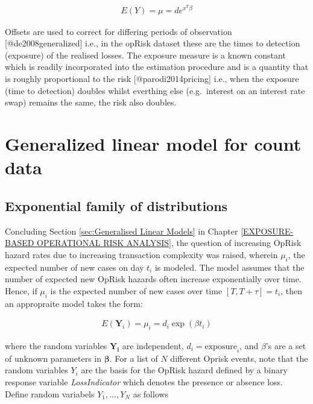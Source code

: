 \documentclass[]{article}
\begin{document}
\singlespacing

\begin{eqnarray}
E(Y) = \mu = d e^{x^T\beta}
\end{eqnarray} \doublespacing

Offsets are used to correct for differing periods of observation
{[}@de2008generalized{]} i.e., in the opRisk dataset these are the times
to detection (exposure) of the realised losses. The exposure measure is
a known constant which is readily incorporated into the estimation
procedure and is a quantity that is roughly proportional to the risk
{[}@parodi2014pricing{]} i.e., when the exposure (time to detection)
doubles whilst everthing else (e.g.~interest on an interest rate swap)
remains the same, the risk also doubles.

\section{Generalized linear model for count data}
\label{sec:Generalized linear model for count data}

\subsection{Exponential family of distributions}

Concluding Section \ref{sec:Generalised Linear Models} in Chapter
\ref{EXPOSURE-BASED OPERATIONAL RISK ANALYSIS}, the question of
increasing OpRisk hazard rates due to increasing transaction complexity
was raised, wherein \(\mu_i\), the expected number of new cases on day
\(t_i\) is modeled. The model assumes that the number of expected new
OpRisk hazards often increase exponentially over time. Hence, if
\(\mu_i\) is the expected number of new cases over time
\([T,T+\tau] = t_i\), then an appropraite model takes the form:

\singlespacing

\begin{eqnarray}\label{expgrowth}
E(\mathbf{Y}_i) = \mu_i = d_i\exp{(\beta t_i)} 
\end{eqnarray} \doublespacing

where the random variables \(\mathbf{Y_i}\) are independent,
\(d_i = \mbox{exposure}_i\), and \(\beta\)'s are a set of unknown
parameters in \(\mathbf{\beta}\). For a list of \(N\) different Oprisk
events, note that the random variables \(Y_i\) are the basis for the
OpRisk hazard defined by a binary response variable \emph{LossIndicator}
which denotes the presence or absence loss. Define random variabels
\(Y_1,\ldots,Y_N\) as follows
\end{document}
